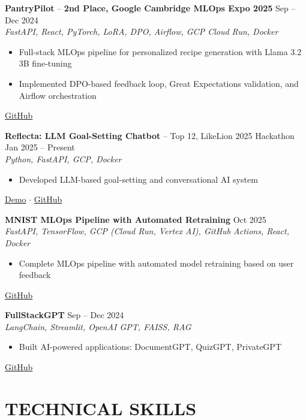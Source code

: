 \documentclass[11pt,a4paper]{article}
\begin{document}
\textbf{PantryPilot} -- \textbf{2nd Place, Google Cambridge MLOps Expo 2025} \hfill Sep -- Dec 2024\\
\textit{FastAPI, React, PyTorch, LoRA, DPO, Airflow, GCP Cloud Run, Docker}
\begin{itemize}[leftmargin=1.5em, nosep]
    \item Full-stack MLOps pipeline for personalized recipe generation with Llama 3.2 3B fine-tuning
    \item Implemented DPO-based feedback loop, Great Expectations validation, and Airflow orchestration
\end{itemize}
\href{https://github.com/Shinhunjun/PantryPilot}{GitHub}

\textbf{Reflecta: LLM Goal-Setting Chatbot} -- Top 12, LikeLion 2025 Hackathon \hfill Jan 2025 -- Present\\
\textit{Python, FastAPI, GCP, Docker}
\begin{itemize}[leftmargin=1.5em, nosep]
    \item Developed LLM-based goal-setting and conversational AI system
\end{itemize}
\href{https://aidiary-reflecta.vercel.app/demo}{Demo} $\cdot$ \href{https://github.com/Shinhunjun/aidiary-reflecta}{GitHub}

\textbf{MNIST MLOps Pipeline with Automated Retraining} \hfill Oct 2025\\
\textit{FastAPI, TensorFlow, GCP (Cloud Run, Vertex AI), GitHub Actions, React, Docker}
\begin{itemize}[leftmargin=1.5em, nosep]
    \item Complete MLOps pipeline with automated model retraining based on user feedback
\end{itemize}
\href{https://github.com/Shinhunjun/MLOps/tree/main/GithubAction_GCP_Docker}{GitHub}

\textbf{FullStackGPT} \hfill Sep -- Dec 2024\\
\textit{LangChain, Streamlit, OpenAI GPT, FAISS, RAG}
\begin{itemize}[leftmargin=1.5em, nosep]
    \item Built AI-powered applications: DocumentGPT, QuizGPT, PrivateGPT
\end{itemize}
\href{https://github.com/Shinhunjun/fullstackGPT}{GitHub}

\section{TECHNICAL SKILLS}
\end{document}

